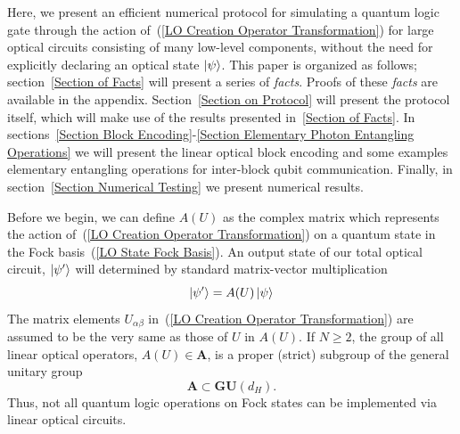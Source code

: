 \documentclass[aps,pra,twocolumn,showpacs,superscriptaddress,floatfix,10pt]{revtex4}
\begin{document}
Here, we present an efficient numerical protocol for simulating a quantum logic gate through the action of~(\ref{LO Creation Operator Transformation}) for large optical circuits consisting of many low-level components, without the need for explicitly declaring an optical state $\ket{\psi}$. This paper is organized as follows; section~\ref{Section of Facts} will present a series of \textit{facts}. Proofs of these \textit{facts} are available in the appendix. Section~\ref{Section on Protocol} will present the protocol itself, which will make use of the results presented in~\ref{Section of Facts}. In sections~\ref{Section Block Encoding}-\ref{Section Elementary Photon Entangling Operations} we will present the linear optical block encoding and some examples elementary entangling operations for inter-block qubit communication. Finally, in section~\ref{Section Numerical Testing} we present numerical results.

Before we begin, we can define $A(U)$ as the complex matrix which represents the action of~(\ref{LO Creation Operator Transformation}) on a quantum state in the Fock basis~(\ref{LO State Fock Basis}). An output state of our total optical circuit, $\ket{\psi^\prime}$ will determined by standard matrix-vector multiplication
\begin{equation}
\label{Matrix Vector Product}
\ket{\psi^\prime} = A(U) \ket{\psi}
\end{equation}
The matrix elements $U_{\alpha \beta}$ in~(\ref{LO Creation Operator Transformation}) are assumed to be the very same as those of $U$ in $A(U)$. If $N \ge 2$, the group of all linear optical operators, $ A(U) \in \textbf{A}$, is a proper (strict) subgroup of the general unitary group
\begin{equation}
\label{Proper Subgroup}
\textbf{A} \subset \textbf{GU}(d_H).
\end{equation}
Thus, not all quantum logic operations on Fock states can be implemented via linear optical circuits.
\end{document}
